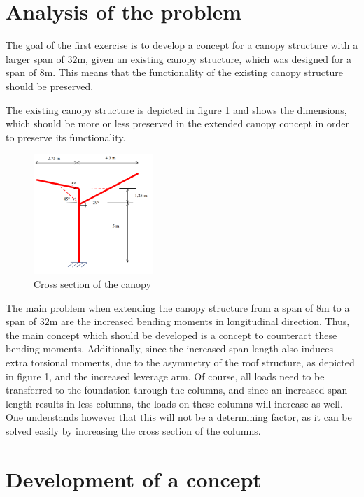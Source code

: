 \documentclass[a4paper]{article}
\begin{document}
\section{Analysis of the problem}

The goal of the first exercise is to develop a concept for a canopy structure with a larger span of $32$m, given an existing canopy structure, which was designed for a span of $8$m. This means that the functionality of the existing canopy structure should be preserved.

The existing canopy structure is depicted in figure \ref{fig:cross} and shows the dimensions, which should be more or less preserved in the extended canopy concept in order to preserve its functionality.

\begin{figure}[h]
\centering
\includegraphics[width=0.4\textwidth]{crosssection.png}
\caption{Cross section of the canopy}
\label{fig:cross}
\end{figure}

The main problem when extending the canopy structure from a span of $8$m to a span of $32$m are the increased bending moments in longitudinal direction. Thus, the main concept which should be developed is a concept to counteract these bending moments. Additionally, since the increased span length also induces extra torsional moments, due to the asymmetry of the roof structure, as depicted in figure 1, and the increased leverage arm. Of course, all loads need to be transferred to the foundation through the columns, and since an increased span length results in less columns, the loads on these columns will increase as well. One understands however that this will not be a determining factor, as it can be solved easily by increasing the cross section of the columns.

\section{Development of a concept}
\end{document}
